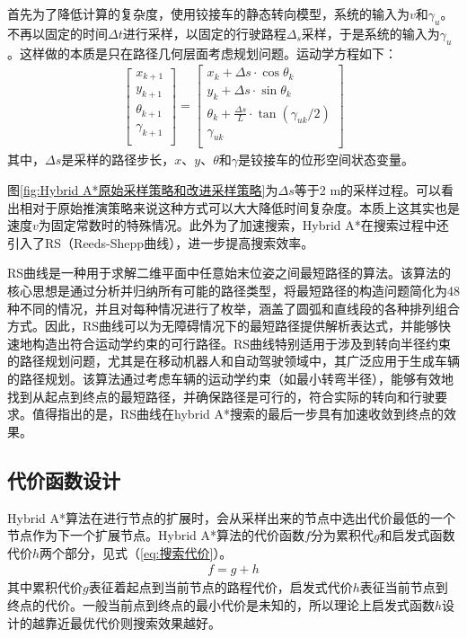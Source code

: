 \documentclass[master,academic]{ysuthesis} %
\begin{document}
		首先为了降低计算的复杂度，使用铰接车的静态转向模型，系统的输入为$v$和$\gamma_u$。不再以固定的时间$\Delta t$进行采样，以固定的行驶路程$\Delta_s$采样，于是系统的输入为$\gamma_u$。这样做的本质是只在路径几何层面考虑规划问题。运动学方程如下：
		\begin{equation}
			\begin{aligned}
				\left[ \begin{array}{c}
					x_{k+1}\\
					y_{k+1}\\
					\theta _{k+1}\\
					\gamma _{k+1}\\
				\end{array} \right] =\left[ \begin{array}{c}
					x_k+\Delta s\cdot \cos\theta _k\\
					y_k+\Delta s\cdot \sin\theta _k\\
					\theta _k+\frac{\Delta s}{L}\cdot \tan (\gamma _{uk}/2 )\\
					\gamma _{uk}\\
				\end{array} \right] 
			\end{aligned}
			\label{eq:改进运动学推演策略}
		\end{equation}
		其中，$\Delta s$是采样的路径步长，$x$、$y$、$\theta$和$\gamma$是铰接车的位形空间状态变量。

		图\ref{fig:Hybrid A*原始采样策略和改进采样策略}为$\Delta s$等于2 m的采样过程。可以看出相对于原始推演策略来说这种方式可以大大降低时间复杂度。本质上这其实也是速度$v$为固定常数时的特殊情况。此外为了加速搜索，Hybrid A*在搜索过程中还引入了RS（Reeds-Shepp曲线），进一步提高搜索效率。
		
		RS曲线是一种用于求解二维平面中任意始末位姿之间最短路径的算法。该算法的核心思想是通过分析并归纳所有可能的路径类型，将最短路径的构造问题简化为48种不同的情况，并且对每种情况进行了枚举，涵盖了圆弧和直线段的各种排列组合方式。因此，RS曲线可以为无障碍情况下的最短路径提供解析表达式，并能够快速地构造出符合运动学约束的可行路径。RS曲线特别适用于涉及到转向半径约束的路径规划问题，尤其是在移动机器人和自动驾驶领域中，其广泛应用于生成车辆的路径规划。该算法通过考虑车辆的运动学约束（如最小转弯半径），能够有效地找到从起点到终点的最短路径，并确保路径是可行的，符合实际的转向和行驶要求。值得指出的是，RS曲线在hybrid A*搜索的最后一步具有加速收敛到终点的效果。

		\subsection{代价函数设计}
		Hybrid A*算法在进行节点的扩展时，会从采样出来的节点中选出代价最低的一个节点作为下一个扩展节点。Hybrid A*算法的代价函数$f$分为累积代$g$和启发式函数代价$h$两个部分，见式（\ref{eq:搜索代价}）。
		\begin{equation}
			\begin{aligned}
				f = g+h
			\end{aligned}
			\label{eq:搜索代价}
		\end{equation}
		其中累积代价$g$表征着起点到当前节点的路程代价，启发式代价$h$表征当前节点到终点的代价。一般当前点到终点的最小代价是未知的，所以理论上启发式函数$h$设计的越靠近最优代价则搜索效果越好。
		
\end{document}
